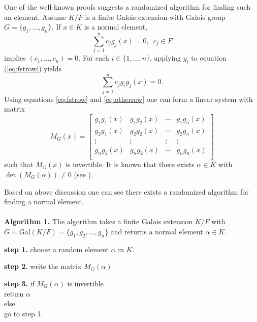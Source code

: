 \documentclass[sigconf]{acmart}
\theoremstyle{acmplain}
\begin{document}
 
One of the well-known proofs suggests a randomized algorithm for finding such an element. 
Assume $K/F$ is a finite Galois extension with Galois group $G = \lbrace g_1 , \ldots ,
 g_n \rbrace$. If $x \in K$ is a normal element, 
 \begin{equation}\label{eq:fstrow}
 \sum_{j=1}^n 
 c_j g_j(x)=0, \,\,\, c_j \in F 
 \end{equation} 
 implies $(c_1, \ldots ,c_n) = 0$. For each $i \in \lbrace 1, \ldots , n\rbrace$, applying $g_i$ to equation (\ref{eq:fstrow}) yields
\begin{equation} \label{eq:otherrow}
 \sum_{j=1}^n 
 c_j g_i g_j(x)=0.
 \end{equation}
 Using equations \ref{eq:fstrow} and \ref{eq:otherrow} one can form a linear system with 
 matrix 
 $$ M_G(x) =
\begin{bmatrix}
g_1 g_1(x) & g_1 g_2(x) & \cdots & g_1 g_n(x) \\
g_2 g_1(x) & g_2 g_2(x) & \cdots & g_2 g_n(x) \\
\vdots		& \vdots	& \vdots & \vdots \\
g_n g_1(x) & g_n g_2(x) & \cdots & g_n g_n(x) \\
\end{bmatrix} 
 $$
 such that $M_G(x)$ is invertible. It is known that there exists $\alpha \in K$ with 
 $\det(M_G(\alpha))\neq 0$  (see \cite[Theorem 6.13.1]{Lang}).
 
 
 Based on above discussion one can see there exists a randomized algorithm for finding a
 normal element.\\
 \\
 \textbf{Algorithm 1.} \label{Alg:Naive}
 The algorithm takes a finite Galois extension $K/F$ with 
 $G =  \mathrm{Gal}(K/F) = \lbrace g_1, g_2, \ldots , g_n \rbrace$ and returns a normal
 element $\alpha \in K$.
 \begin{description}
 \item \textbf{step 1.} choose a random element $\alpha$ in $K$.
 \item \textbf{step 2.} write the matrix $M_G(\alpha)$.
 \item \textbf{step 3.} if $ M_G(\alpha)$ is invertible\\
 \hspace{10cm} return $\alpha$\\
 \hspace{2cm} else \\
 \hspace{5cm} go to step 1.\\  
 \end{description}
 
\end{document}
